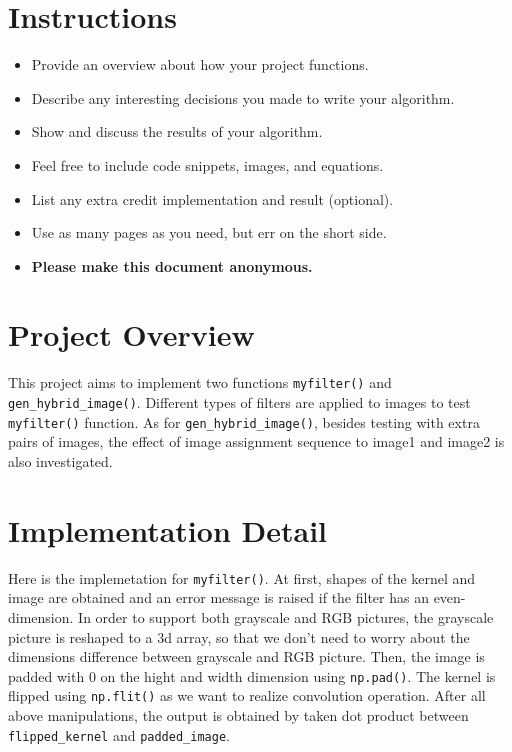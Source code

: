 \section*{Instructions}
\begin{itemize}
  \item Provide an overview about how your project functions. 
  \item Describe any interesting decisions you made to write your algorithm.
  \item Show and discuss the results of your algorithm.
  \item Feel free to include code snippets, images, and equations.
  \item List any extra credit implementation and result (optional).
  \item Use as many pages as you need, but err on the short side.
  \item \textbf{Please make this document anonymous.}
\end{itemize}

\section*{Project Overview}

This project aims to implement two functions \verb|myfilter()| and \verb|gen_hybrid_image()|. Different types of filters are applied to images to test \verb|myfilter()| function. As for \verb|gen_hybrid_image()|, besides testing with extra pairs of images, the effect of image assignment sequence to image1 and image2 is also investigated.

\section*{Implementation Detail}

Here is the implemetation for \verb|myfilter()|. At first, shapes of the kernel and image are obtained and an error message is raised if the filter has an even-dimension. In order to support both grayscale and RGB pictures, the grayscale picture is reshaped to a 3d array, so that we don't need to worry about the dimensions difference between grayscale and RGB picture. Then, the image is padded with 0 on the hight and width dimension using \verb|np.pad()|. The kernel is flipped using \verb|np.flit()| as we want to realize convolution operation. After all above manipulations, the output is obtained by taken dot product between \verb|flipped_kernel| and \verb|padded_image|. 

